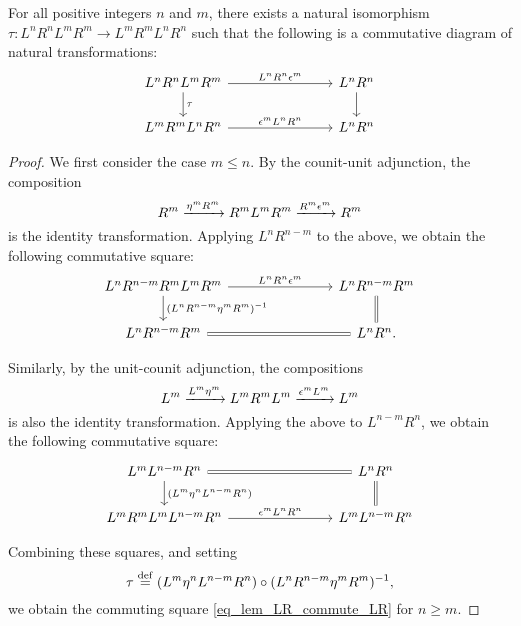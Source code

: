 \begin{lem}\label{lem_LR_commute_LR}
For all positive integers $n$ and $m$, there exists a natural 
isomorphism $\tau : L^nR^nL^mR^m \to L^mR^mL^nR^n$ such that the 
following is a commutative diagram of natural transformations:
\begin{equation}\label{eq_lem_LR_commute_LR}
\begin{tikzcd}[column sep=75pt]
L^n R^n L^m R^m \arrow{r}{L^nR^n \epsilon^m} \arrow{d}{\tau} &
L^nR^n \arrow{d} \\
L^mR^m L^nR^n \arrow{r}{\epsilon^m L^nR^n} &
L^nR^n
\end{tikzcd}
\end{equation}
\end{lem}
\begin{proof}
We first consider the case $m \leq n$. By the counit-unit 
adjunction, the composition
\[
R^m \xrightarrow{\eta^m R^m}
R^m L^m R^m \xrightarrow{R^m \epsilon^m}
R^m
\]
is the identity transformation. Applying $L^nR^{n - m}$ to the 
above, we obtain the following commutative square:
\[
\begin{tikzcd}[column sep=75pt]
L^nR^{n - m}R^mL^mR^m \arrow{r}{L^nR^n\cuHI^m} 
   \arrow{d}{(L^nR^{n - m}\eta^m R^m)^{-1}} &
L^nR^{n - m}R^m \arrow[equals]{d} \\
L^nR^{n - m}R^m \arrow[equals]{r} &
L^nR^n.
\end{tikzcd}
\]

Similarly, by the unit-counit adjunction, the compositions
\[
L^m \xrightarrow{L^m \eta^m} L^m R^m L^m 
   \xrightarrow{\epsilon^m L^m} L^m
\]
is also the identity transformation. Applying the above to 
$L^{n - m}R^n$, we obtain the following commutative square:
\[
\begin{tikzcd}[column sep=75pt]
L^mL^{n - m}R^n \arrow[equals]{r} 
   \arrow{d}{(L^m\eta^n L^{n - m}R^n)} &
L^nR^n \arrow[equals]{d} \\
L^mR^mL^mL^{n - m}R^n \arrow{r}{\cuHI^m L^nR^n} &
L^mL^{n - m}R^n 
\end{tikzcd}
\]

Combining these squares, and setting 
\[
\tau \stackrel{\mathrm{def}}{=} (L^m\eta^n L^{n - m}R^n) \circ
(L^nR^{n - m}\eta^m R^m)^{-1},
\]
we obtain the commuting square \eqref{eq_lem_LR_commute_LR} for 
$n \geq m$. 


\end{proof}
